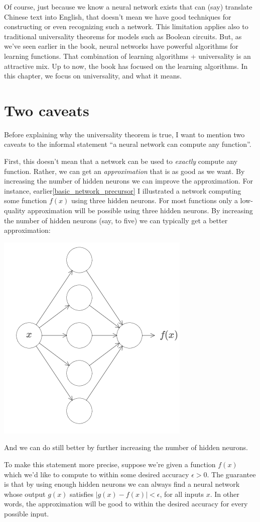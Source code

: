 \documentclass[a4paper,twoside,10pt]{book}
\begin{document}
Of course, just because we know a neural network exists that can (say) translate Chinese text into English, that doesn't mean we have good techniques for constructing or even recognizing such a network. This limitation applies also to traditional universality theorems for models such as Boolean circuits. But, as we've seen earlier in the book, neural networks have powerful algorithms for learning functions. That combination of learning algorithms + universality is an attractive mix. Up to now, the book has focused on the learning algorithms. In this chapter, we focus on universality, and what it means.


\section{Two caveats}
Before explaining why the universality theorem is true, I want to mention two caveats to the informal statement ``a neural network can compute any function''.

First, this doesn't mean that a network can be used to \textit{exactly} compute any function. Rather, we can get an \textit{approximation} that is as good as we want. By increasing the number of hidden neurons we can improve the approximation. For instance, earlier\ref{basic_network_precursor} I illustrated a network computing some function $f(x)$ using three hidden neurons. For most functions only a low-quality approximation will be possible using three hidden neurons. By increasing the number of hidden neurons (say, to five) we can typically get a better approximation:
\begin{center}
	\includegraphics[width=0.43\linewidth]{figures/ch4/tikz402}
\end{center}
And we can do still better by further increasing the number of hidden neurons.

To make this statement more precise, suppose we're given a function $f(x)$ which we'd like to compute to within some desired accuracy $\epsilon>0$. The guarantee is that by using enough hidden neurons we can always find a neural network whose output $g(x)$ satisfies $|g(x)-f(x)|<\epsilon$, for all inputs $x$. In other words, the approximation will be good to within the desired accuracy for every possible input.
\end{document}
